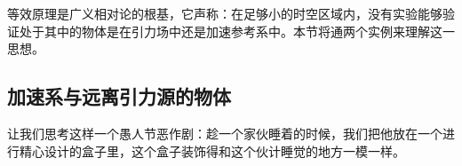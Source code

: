
等效原理是广义相对论的根基，它声称：在足够小的时空区域内，没有实验能够验证处于其中的物体是在引力场中还是加速参考系中。本节将通两个实例来理解这一思想。

\subsection{加速系与远离引力源的物体}
让我们思考这样一个愚人节恶作剧：趁一个家伙睡着的时候，我们把他放在一个进行精心设计的盒子里，这个盒子装饰得和这个伙计睡觉的地方一模一样。
